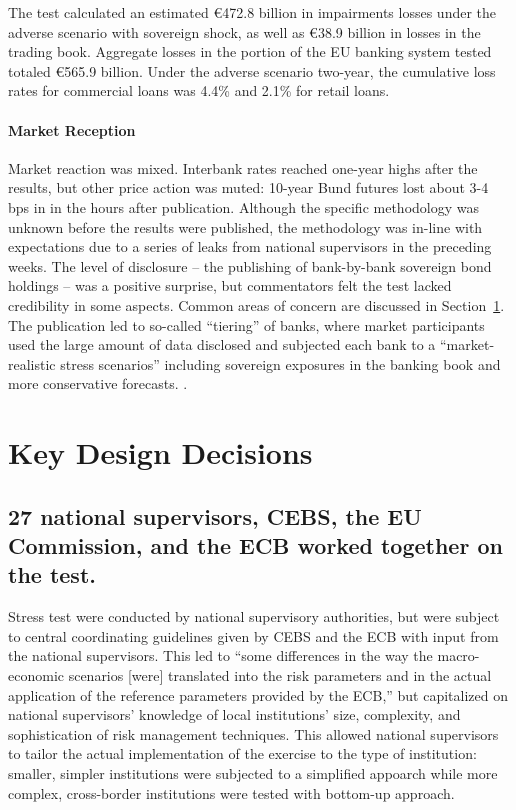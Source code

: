 \documentclass[12pt]{article}
\begin{document}
The test calculated an estimated \euro{472.8} billion in impairments losses under the adverse scenario with sovereign shock, as well as \euro{38.9} billion in losses in the trading book. Aggregate losses in the portion of the EU banking system tested totaled \euro{565.9} billion. Under the adverse scenario two-year, the cumulative loss rates for commercial loans was 4.4\%  and 2.1\% for retail loans.

\paragraph{Market Reception} Market reaction was mixed. Interbank rates reached one-year highs after the results, but other price action was muted: 10-year Bund futures lost about 3-4 bps in  in the hours after publication. Although the specific methodology was unknown before the results were published, the methodology was in-line with expectations due to a series of leaks from national supervisors in the preceding weeks. The level of disclosure -- the publishing of bank-by-bank sovereign bond holdings -- was a positive surprise, but commentators felt the test lacked credibility in some aspects. Common areas of concern are discussed in Section~\ref{keydesign}. The publication led to so-called ``tiering'' of banks, where market participants used the large amount of data disclosed and subjected each bank to a ``market-realistic stress scenarios'' including sovereign exposures in the banking book and more conservative forecasts. \citep{Nedialkov}.

\section{Key Design Decisions}\label{keydesign}

\subsection{27 national supervisors, CEBS, the EU Commission, and the ECB worked together on the test.}

Stress test were conducted by national supervisory authorities, but were subject to central coordinating guidelines given by CEBS and the ECB with input from the national supervisors. This led to ``some differences in the way the macro-economic scenarios [were] translated into the risk parameters and in the actual application of the reference parameters provided by the ECB,'' but capitalized on national supervisors' knowledge of local institutions' size, complexity, and sophistication of risk management techniques. This allowed national supervisors to tailor the actual implementation of the exercise to the type of institution: smaller, simpler institutions were subjected to a simplified appoarch while more complex, cross-border institutions were tested with bottom-up approach.
\end{document}
